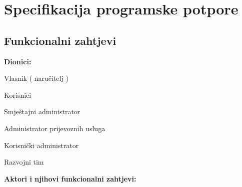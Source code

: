 \chapter{Specifikacija programske potpore}
		
	\section{Funkcionalni zahtjevi}		
			
			\noindent \textbf{Dionici:}
			
			\begin{packed_enum}
				
				\item Vlasnik ( naručitelj )
				\item Korisnici
				\begin{packed_enum}
					\item Smještajni administrator 
					\item Administrator prijevoznih usluga 
					\item Korisnički administrator
				\end{packed_enum}			
				\item Razvojni tim 
				
			\end{packed_enum}
			
			\noindent \textbf{Aktori i njihovi funkcionalni zahtjevi:}
			
